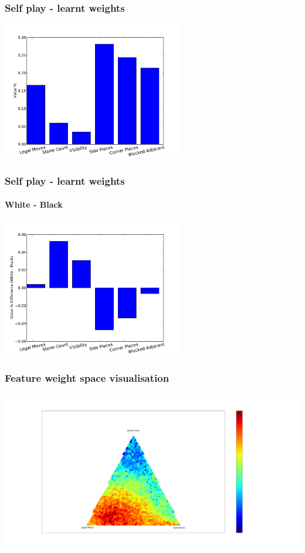 \documentclass[10pt]{beamer}
\begin{document}
\begin{frame}
  \frametitle{Self play - learnt weights}
  \begin{center} \includegraphics[height=6cm]{Graphs/SelfPlay_Weights.pdf}  \end{center} 
\end{frame}

\begin{frame}
  \frametitle{Self play - learnt weights}
  \framesubtitle{White - Black}
  \begin{center} \includegraphics[height=6cm]{Graphs/SelfPlay_Weights_WhiteBlackDiff.pdf}  \end{center} 
\end{frame}

\begin{frame}
  \frametitle{Feature weight space visualisation}
  \begin{center} \includegraphics[trim= 12cm 4cm 23cm 7cm, clip, height=7cm]{Graphs/LegalMoves_Count_SidePieces_Triangle.pdf}  \end{center}
\end{frame}
\end{document}
